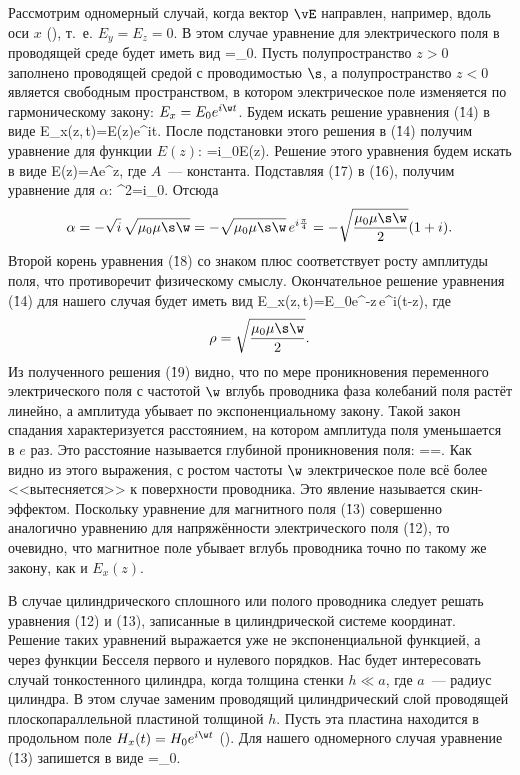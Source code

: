 Рассмотрим одномерный случай, когда вектор $\vE$ направлен, например, вдоль оси $x$ (), т.~е. $E_y=E_z=0$. В этом
случае уравнение для электрического поля в проводящей среде будет иметь вид
=\mu_0\mu\s{}.
\ee
Пусть полупространство $z>0$ заполнено проводящей средой с проводимостью $\s$, а полупространство $z<0$ является
свободным пространством, в котором электрическое поле изменяется по гармоническому закону: $E_x=E_0e^{i\w t}$. Будем
искать решение уравнения (\r{14}) в виде
E_x(z,\,t)=E(z)e^{i\w t}.
\ee
После подстановки этого решения в (\r{14}) получим уравнение для функции $E(z)$:
=i\mu_0\mu\s\w E(z).
\ee
Решение этого уравнения будем искать в виде
E(z)=Ae^{\alpha z},
\ee
где $A$~--- константа. Подставляя (\r{17}) в (\r{16}), получим уравнение для $\alpha$:
\alpha^2=i\mu_0\mu\s\w.
\ee
Отсюда
\[
\alpha=-\sqrt{i}\,\sqrt{\mu_0\mu\s\w}=-\sqrt{\mu_0\mu\s\w}\,e^{i\frac{\pi}{4}}=-\sqrt{\frac{\mu_0\mu\s\w}{2}}(1+i).
\]
Второй корень уравнения (\r{18}) со знаком плюс соответствует росту амплитуды поля, что противоречит физическому смыслу.
Окончательное решение уравнения (\r{14}) для нашего случая будет иметь вид
E_x(z,\,t)=E_0e^{-\rho z}\,e^{i(\w t-\rho z)},
\ee
где
\[
\rho=\sqrt{\frac{\mu_0\mu\s\w}{2}}.
\]
Из полученного решения (\r{19}) видно, что по мере проникновения переменного электрического поля с частотой $\w$ вглубь
проводника фаза колебаний поля растёт линейно, а амплитуда убывает по экспоненциальному закону. Такой закон спадания
характеризуется расстоянием, на котором амплитуда поля уменьшается в $e$ раз. Это расстояние называется глубиной
проникновения поля:
\delta==.
\ee
Как видно из этого выражения, с ростом частоты $\w$ электрическое поле всё более <<вытесняется>> к поверхности
проводника. Это явление называется скин-эффектом. Поскольку уравнение для магнитного поля (\r{13}) совершенно аналогично
уравнению для напряжённости электрического поля (\r{12}), то очевидно, что магнитное поле убывает вглубь проводника
точно по такому же закону, как и $E_x(z)$.

В случае цилиндрического сплошного или полого проводника следует решать уравнения (\r{12}) и (\r{13}), записанные в
цилиндрической системе координат. Решение таких уравнений выражается уже не экспоненциальной функцией, а через функции
Бесселя первого и нулевого порядков. Нас будет интересовать случай тонкостенного цилиндра, когда толщина стенки $h\ll a$,
где $a$~--- радиус цилиндра. В этом случае заменим проводящий цилиндрический слой проводящей плоскопараллельной пластиной
толщиной $h$. Пусть эта пластина находится в продольном поле $H_x(t)=H_0e^{i\w t}$ (). Для нашего одномерного случая
уравнение (\r{13}) запишется в виде
=\mu_0\mu\s{}.
\ee

